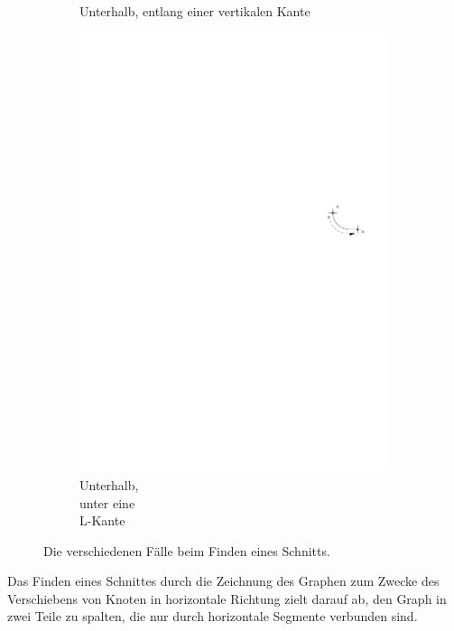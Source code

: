 \documentclass[a4paper]{scrreprt}
\theoremstyle{definition}
\begin{document}
\begin{figure}[h]
\begin{subfigure}[b]{0.2\textwidth}
                \caption{Unterhalb, entlang einer vertikalen Kante}
                \label{fig:cutfinding_bot_vertical}
        \end{subfigure}
        \quad
        \begin{subfigure}[b]{0.2\textwidth}
                \includegraphics[width=\textwidth]{schnitt_finden_bot_belowL}
                \caption{Unterhalb, \\ unter eine \\ L-Kante}
                \label{fig:cutfinding_bot_belowL}
        \end{subfigure}
        \caption{Die verschiedenen Fälle beim Finden eines Schnitts.}\label{fig:cutfinding}
\end{figure}


Das Finden eines Schnittes durch die Zeichnung des Graphen zum Zwecke des Verschiebens von Knoten in horizontale Richtung zielt darauf ab, den Graph in zwei Teile zu spalten, die nur durch horizontale Segmente verbunden sind. 
\end{document}
